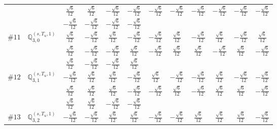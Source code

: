 \documentclass[fleqn,9pt,landscape]{jsarticle}
\begin{document}
\begin{center}
\begin{longtable}{lcccccccccc}
& $ \frac{\sqrt{6}}{12} $ & $ \frac{\sqrt{6}}{12} $ & $ - \frac{\sqrt{6}}{12} $ & $ - \frac{\sqrt{6}}{12} $ & $ - \frac{\sqrt{6}}{12} $ & $ - \frac{\sqrt{6}}{12} $ & $ - \frac{\sqrt{6}}{12} $ & $ - \frac{\sqrt{6}}{12} $ & $ - \frac{\sqrt{6}}{12} $ & $ - \frac{\sqrt{6}}{12} $ \\
& $ - \frac{\sqrt{6}}{12} $ & $ - \frac{\sqrt{6}}{12} $ & $ - \frac{\sqrt{6}}{12} $ & $ - \frac{\sqrt{6}}{12} $ & $  $ & $  $ & $  $ & $  $ & $  $ & $  $ \\ \hline
$ \#11\quad \mathbb{Q}_{3,0}^{(s,T_{u},1)} $ & $ \frac{\sqrt{6}}{12} $ & $ - \frac{\sqrt{6}}{12} $ & $ \frac{\sqrt{6}}{12} $ & $ - \frac{\sqrt{6}}{12} $ & $ - \frac{\sqrt{6}}{12} $ & $ \frac{\sqrt{6}}{12} $ & $ - \frac{\sqrt{6}}{12} $ & $ \frac{\sqrt{6}}{12} $ & $ - \frac{\sqrt{6}}{12} $ & $ \frac{\sqrt{6}}{12} $ \\
& $ \frac{\sqrt{6}}{12} $ & $ - \frac{\sqrt{6}}{12} $ & $ - \frac{\sqrt{6}}{12} $ & $ \frac{\sqrt{6}}{12} $ & $ - \frac{\sqrt{6}}{12} $ & $ \frac{\sqrt{6}}{12} $ & $ \frac{\sqrt{6}}{12} $ & $ - \frac{\sqrt{6}}{12} $ & $ \frac{\sqrt{6}}{12} $ & $ - \frac{\sqrt{6}}{12} $ \\
& $ \frac{\sqrt{6}}{12} $ & $ - \frac{\sqrt{6}}{12} $ & $ - \frac{\sqrt{6}}{12} $ & $ \frac{\sqrt{6}}{12} $ & $  $ & $  $ & $  $ & $  $ & $  $ & $  $ \\ \hline
$ \#12\quad \mathbb{Q}_{3,1}^{(s,T_{u},1)} $ & $ - \frac{\sqrt{6}}{12} $ & $ \frac{\sqrt{6}}{12} $ & $ \frac{\sqrt{6}}{12} $ & $ - \frac{\sqrt{6}}{12} $ & $ \frac{\sqrt{6}}{12} $ & $ - \frac{\sqrt{6}}{12} $ & $ - \frac{\sqrt{6}}{12} $ & $ \frac{\sqrt{6}}{12} $ & $ - \frac{\sqrt{6}}{12} $ & $ - \frac{\sqrt{6}}{12} $ \\
& $ \frac{\sqrt{6}}{12} $ & $ \frac{\sqrt{6}}{12} $ & $ \frac{\sqrt{6}}{12} $ & $ - \frac{\sqrt{6}}{12} $ & $ - \frac{\sqrt{6}}{12} $ & $ \frac{\sqrt{6}}{12} $ & $ - \frac{\sqrt{6}}{12} $ & $ \frac{\sqrt{6}}{12} $ & $ \frac{\sqrt{6}}{12} $ & $ - \frac{\sqrt{6}}{12} $ \\
& $ \frac{\sqrt{6}}{12} $ & $ \frac{\sqrt{6}}{12} $ & $ - \frac{\sqrt{6}}{12} $ & $ - \frac{\sqrt{6}}{12} $ & $  $ & $  $ & $  $ & $  $ & $  $ & $  $ \\ \hline
$ \#13\quad \mathbb{Q}_{3,2}^{(s,T_{u},1)} $ & $ - \frac{\sqrt{6}}{12} $ & $ - \frac{\sqrt{6}}{12} $ & $ \frac{\sqrt{6}}{12} $ & $ \frac{\sqrt{6}}{12} $ & $ - \frac{\sqrt{6}}{12} $ & $ - \frac{\sqrt{6}}{12} $ & $ \frac{\sqrt{6}}{12} $ & $ \frac{\sqrt{6}}{12} $ & $ \frac{\sqrt{6}}{12} $ & $ - \frac{\sqrt{6}}{12} $ \\

\end{longtable}
\end{center}
\end{document}
